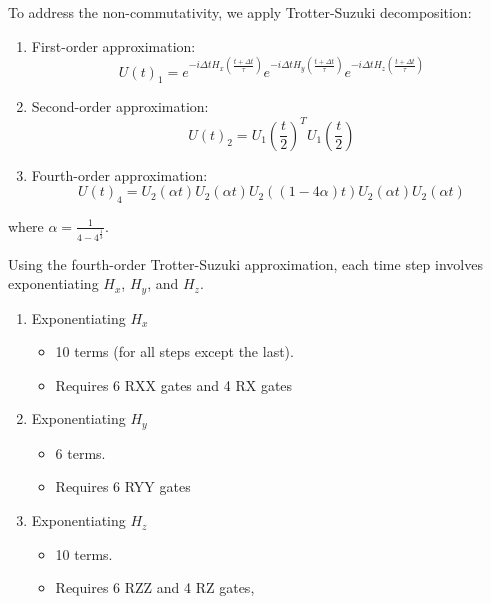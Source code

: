 \documentclass[a4paper, 11pt]{article}
\begin{document}
To address the non-commutativity, we apply Trotter-Suzuki decomposition:
\begin{enumerate}
  \item First-order approximation:
  \begin{equation}
    U(t)_1 = e^{-i \Delta t H_x\left(\frac{t+\Delta t}{\tau}\right)}e^{-i \Delta t H_y\left(\frac{t+\Delta t}{\tau}\right)}e^{-i \Delta t H_z\left(\frac{t+\Delta t}{\tau}\right)}
  \end{equation}
  \item Second-order approximation:
  \begin{equation}
    U(t)_2 = U_1\left(\frac{t}{2}\right)^T U_1\left(\frac{t}{2}\right)
  \end{equation}
  \item Fourth-order approximation:
  \begin{equation}
    U(t)_4 = U_2 \left(\alpha t\right) U_2 \left(\alpha t\right) U_2 \left((1 -4\alpha) t\right) U_2 \left(\alpha t\right) U_2 \left(\alpha t\right)
  \end{equation}
\end{enumerate}
where $\alpha = \frac{1}{4-4^{\frac{1}{3}}}$.

Using the fourth-order Trotter-Suzuki approximation, each time step involves exponentiating $H_x$, $H_y$, and $H_z$.
\begin{enumerate}
  \item Exponentiating $H_x$
  \begin{itemize}
    \item 10 terms (for all steps except the last).
    \item Requires 6 RXX gates and 4 RX gates
  \end{itemize}
  \item Exponentiating $H_y$
  \begin{itemize}
    \item 6 terms.
    \item Requires 6 RYY gates 
  \end{itemize}
  \item Exponentiating $H_z$
  \begin{itemize}
    \item 10 terms.
    \item Requires 6 RZZ and 4 RZ gates,
  \end{itemize}
\end{enumerate}

\end{document}
